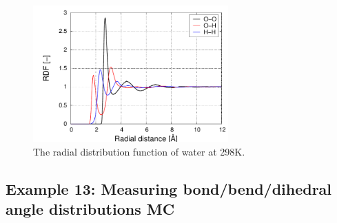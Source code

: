 \begin{figure}[H]
  \centering
  \includegraphics[width=7.5cm]{./Examples/RDFWater.pdf}
  \caption{The radial distribution function of water at 298K.}
  \label{Fig: RDF water}
\end{figure}


\subsection*{Example 13: Measuring bond/bend/dihedral angle distributions MC}

